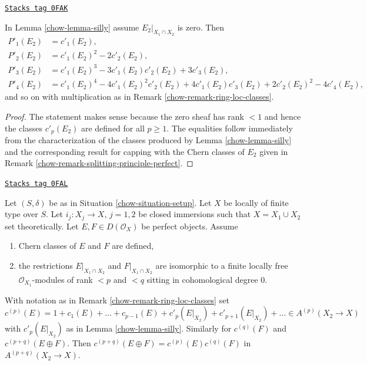 \begin{lemma}
\label{chow-lemma-silly-compose}
\href{https://stacks.math.columbia.edu/tag/0FAK}{\texttt{Stacks tag 0FAK}}

In Lemma \ref{chow-lemma-silly} assume $E_2|_{X_1 \cap X_2}$ is zero. Then
\begin{align*}
P'_1(E_2) & = c'_1(E_2), \\
P'_2(E_2) & = c'_1(E_2)^2 - 2c'_2(E_2), \\
P'_3(E_2) & = c'_1(E_2)^3 - 3c'_1(E_2)c'_2(E_2) + 3c'_3(E_2), \\
P'_4(E_2) & = c'_1(E_2)^4 - 4c'_1(E_2)^2c'_2(E_2) +
4c'_1(E_2)c'_3(E_2) + 2c'_2(E_2)^2 - 4c'_4(E_2),
\end{align*}
and so on with multiplication as in Remark \ref{chow-remark-ring-loc-classes}.
\end{lemma}

\begin{proof}

The statement makes sense because the zero sheaf has rank $< 1$ and
hence the classes $c'_p(E_2)$ are defined for all $p \geq 1$. The equalities
follow immediately from the characterization of the classes produced
by Lemma \ref{chow-lemma-silly} and the corresponding result for
capping with the Chern classes of $E_2$ given in
Remark \ref{chow-remark-splitting-principle-perfect}.
\end{proof}

\begin{lemma}
\label{chow-lemma-silly-sum-c}
\href{https://stacks.math.columbia.edu/tag/0FAL}{\texttt{Stacks tag 0FAL}}

Let $(S, \delta)$ be as in Situation \ref{chow-situation-setup}. Let $X$ be
locally of finite type over $S$. Let $i_j : X_j \to X$, $j = 1, 2$
be closed immersions such that $X = X_1 \cup X_2$ set theoretically. Let
$E, F \in D(\mathcal{O}_X)$ be perfect objects. Assume
\begin{enumerate}
\item Chern classes of $E$ and $F$ are defined,
\item the restrictions $E|_{X_1 \cap X_2}$ and $F|_{X_1 \cap X_2}$
are isomorphic to a finite locally free $\mathcal{O}_{X_1}$-modules
of rank $< p$ and $< q$ sitting in cohomological degree $0$.
\end{enumerate}
With notation as in Remark \ref{chow-remark-ring-loc-classes} set
$$
c^{(p)}(E) = 1 + c_1(E) + \ldots + c_{p - 1}(E) +
c'_p(E|_{X_2}) + c'_{p + 1}(E|_{X_2}) + \ldots \in A^{(p)}(X_2 \to X)
$$
with $c'_p(E|_{X_2})$ as in Lemma \ref{chow-lemma-silly}. Similarly
for $c^{(q)}(F)$ and $c^{(p + q)}(E \oplus F)$.
Then $c^{(p + q)}(E \oplus F) = c^{(p)}(E)c^{(q)}(F)$
in $A^{(p + q)}(X_2 \to X)$.
\end{lemma}

